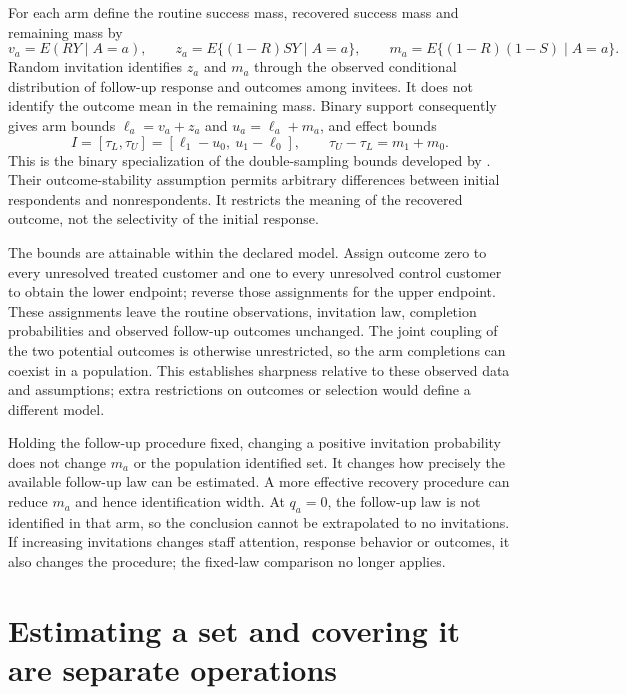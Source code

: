 For each arm define the routine success mass, recovered success mass and
remaining mass by
\[
 v_a=E(RY\mid A=a),\qquad
 z_a=E\{(1-R)SY\mid A=a\},\qquad
 m_a=E\{(1-R)(1-S)\mid A=a\}.
\]
Random invitation identifies $z_a$ and $m_a$ through the observed conditional
distribution of follow-up response and outcomes among invitees. It does not
identify the outcome mean in the remaining mass. Binary support consequently
gives arm bounds $\ell_a=v_a+z_a$ and $u_a=\ell_a+m_a$, and effect bounds
\begin{equation}
 I=[\tau_L,\tau_U]=[\ell_1-u_0,\ u_1-\ell_0],\qquad
 \tau_U-\tau_L=m_1+m_0.
 \label{rel73:identified-set}
\end{equation}
This is the binary specialization of the double-sampling bounds developed
by \citet{rel73coppock2017}. Their outcome-stability assumption permits
arbitrary differences between initial respondents and nonrespondents. It
restricts the meaning of the recovered outcome, not the selectivity of the
initial response.

The bounds are attainable within the declared model. Assign outcome zero
to every unresolved treated customer and one to every unresolved control
customer to obtain the lower endpoint; reverse those assignments for the
upper endpoint. These assignments leave the routine observations,
invitation law, completion probabilities and observed follow-up outcomes
unchanged. The joint coupling of the two potential outcomes is otherwise
unrestricted, so the arm completions can coexist in a population. This
establishes sharpness relative to these observed data and assumptions; extra
restrictions on outcomes or selection would define a different model.

Holding the follow-up procedure fixed, changing a positive invitation
probability does not change $m_a$ or the population identified set. It
changes how precisely the available follow-up law can be estimated. A more
effective recovery procedure can reduce $m_a$ and hence identification width.
At $q_a=0$, the follow-up law is not identified in that arm, so the conclusion
cannot be extrapolated to no invitations. If increasing invitations changes
staff attention, response behavior or outcomes, it also changes the procedure;
the fixed-law comparison no longer applies.

\section{Estimating a set and covering it are separate operations}

